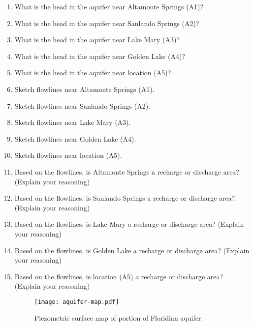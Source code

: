 \documentclass[12pt]{article}
\begin{document}
\begin{enumerate}
\begin{enumerate}
\item What is the head in the aquifer near Altamonte Springs (A1)?
\item What is the head in the aquifer near Sanlando Springs (A2)?
\item What is the head in the aquifer near Lake Mary (A3)?
\item What is the head in the aquifer near Golden Lake (A4)?
\item What is the head in the aquifer near location (A5)?
\item Sketch flowlines near Altamonte Springs (A1).
\item Sketch flowlines near Sanlando Springs (A2).
\item Sketch flowlines near Lake Mary (A3).
\item Sketch flowlines near Golden Lake (A4).
\item Sketch flowlines near location (A5).
\item Based on the flowlines, is Altamonte Springs a recharge or discharge area?  (Explain your reasoning)
\item Based on the flowlines, is Sanlando Springs a recharge or discharge area?  (Explain your reasoning)
\item Based on the flowlines, is Lake Mary a recharge or discharge area?  (Explain your reasoning)
\item Based on the flowlines, is Golden Lake a recharge or discharge area?  (Explain your reasoning)
\item Based on the flowlines, is location (A5) a recharge or discharge area?  (Explain your reasoning)
\begin{figure}[h!] %
   \centering
   \texttt{[image: aquifer-map.pdf]} 
   \caption{Piezometric surface map of portion of Floridian aquifer.}
   \label{fig:aquifer-map.pdf}
\end{figure}
\clearpage

\end{enumerate}


\end{enumerate}
\end{document}
